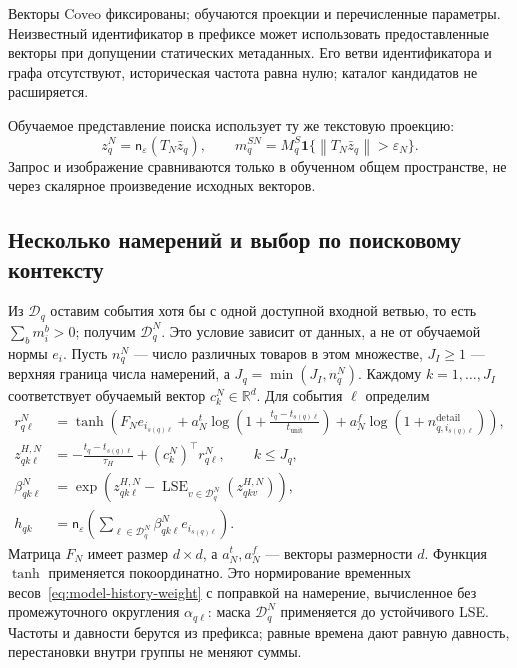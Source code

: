 \documentclass[12pt,a4paper]{article}
\newcommand{\R}{\mathbb R}
\newcommand{\ind}{\mathbf 1}
\newcommand{\eps}{\varepsilon}
\newcommand{\norm}[1]{\left\lVert#1\right\rVert}
\theoremstyle{plainru}
\begin{document}
Векторы Coveo фиксированы; обучаются проекции и перечисленные параметры.
Неизвестный идентификатор в префиксе может использовать предоставленные
векторы при допущении статических метаданных. Его ветви идентификатора
и графа отсутствуют, историческая частота равна нулю;
каталог кандидатов не расширяется.

Обучаемое представление поиска использует ту же текстовую проекцию:
\begin{equation}\label{eq:modern-query-vector}
z_q^N=\mathsf n_\eps(T_N\bar z_q),\qquad
m_q^{SN}=M_q^S\ind\{\norm{T_N\bar z_q}>\eps_N\}.
\end{equation}
Запрос и изображение сравниваются только в обученном общем пространстве,
не через скалярное произведение исходных векторов.

\subsection{Несколько намерений и выбор по поисковому контексту}
\label{sec:modern-intents}

Из $\mathcal D_q$ оставим события хотя бы с одной доступной входной
ветвью, то есть $\sum_bm_i^b>0$; получим $\mathcal D_q^N$.
Это условие зависит от данных, а не от обучаемой нормы $e_i$.
Пусть $n_q^N$ --- число различных
товаров в этом множестве, $J_I\ge1$ --- верхняя граница числа
намерений, а $J_q=\min(J_I,n_q^N)$.
Каждому $k=1,\ldots,J_I$ соответствует обучаемый вектор
$c_k^N\in\R^d$. Для события $\ell$ определим
\begin{align}\label{eq:modern-history-transform}
r_{q\ell}^{N}&=\tanh\!\left(
F_Ne_{i_{s(q)\ell}}
+a_N^t\log\!\left(1+\frac{t_q-t_{s(q)\ell}}{t_{\mathrm{unit}}}\right)
+a_N^f\log(1+n_{q,i_{s(q)\ell}}^{\mathrm{detail}})
\right),\\
z_{qk\ell}^{H,N}
&=-\frac{t_q-t_{s(q)\ell}}{\tau_H}+(c_k^N)^\top r_{q\ell}^{N},
\qquad k\le J_q,\nonumber\\
\beta_{qk\ell}^{N}
&=\exp\!\left(z_{qk\ell}^{H,N}
-\operatorname{LSE}_{v\in\mathcal D_q^N}(z_{qkv}^{H,N})\right),
\nonumber\\
h_{qk}&=\mathsf n_\eps\!\left(
\sum_{\ell\in\mathcal D_q^N}\beta_{qk\ell}^{N}e_{i_{s(q)\ell}}
\right).
\nonumber
\end{align}
Матрица $F_N$ имеет размер $d\times d$, а $a_N^t,a_N^f$ ---
векторы размерности $d$. Функция $\tanh$ применяется покоординатно.
Это нормирование временных весов~\eqref{eq:model-history-weight}
с поправкой на намерение, вычисленное без промежуточного округления
$\alpha_{q\ell}$: маска $\mathcal D_q^N$ применяется до устойчивого LSE.
Частоты и давности берутся из префикса; равные времена дают
равную давность, перестановки внутри группы не меняют суммы.
\end{document}

